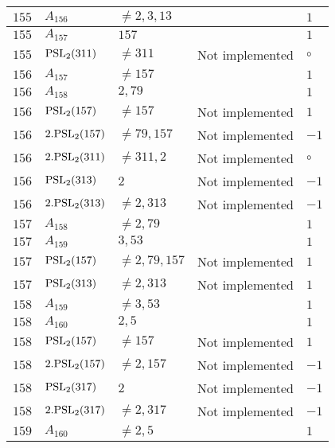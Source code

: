 \documentclass[a4paper, 11pt]{article}
\begin{document}
\begin{longtable}{lllll}
        $ 155 $ & $ A_{156} $ & $ \neq 2, 3, 13 $ & $ ~ $ & $ 1  $ \\ \hline
        $ 155 $ & $ A_{157} $ & $ 157 $ & $ ~ $ & $ 1  $ \\ \hline
        $ 155 $ & $ {\rm PSL}_{2}(311) $ & $ \neq 311 $ & Not implemented & $\circ$ \\ \hline
        $ 156 $ & $ A_{157} $ & $ \neq 157 $ & $ ~ $ & $ 1  $ \\ \hline
        $ 156 $ & $ A_{158} $ & $ 2, 79 $ & $ ~ $ & $ 1  $ \\ \hline
        $ 156 $ & $ {\rm PSL}_{2}(157) $ & $ \neq 157 $ & Not implemented & $ 1  $ \\ \hline
        $ 156 $ & $ 2.{\rm PSL}_{2}(157) $ & $ \neq 79, 157 $ & Not implemented & $ -1  $ \\ \hline
        $ 156 $ & $ 2.{\rm PSL}_{2}(311) $ & $ \neq 311, 2 $ & Not implemented & $\circ$ \\ \hline
        $ 156 $ & $ {\rm PSL}_{2}(313) $ & $ 2 $ & Not implemented & $ -1  $ \\ \hline
        $ 156 $ & $ 2.{\rm PSL}_{2}(313) $ & $ \neq 2, 313 $ & Not implemented & $ -1  $ \\ \hline
        $ 157 $ & $ A_{158} $ & $ \neq 2, 79 $ & $ ~ $ & $ 1  $ \\ \hline
        $ 157 $ & $ A_{159} $ & $ 3, 53 $ & $ ~ $ & $ 1  $ \\ \hline
        $ 157 $ & $ {\rm PSL}_{2}(157) $ & $ \neq 2, 79, 157 $ & Not implemented & $ 1  $ \\ \hline
        $ 157 $ & $ {\rm PSL}_{2}(313) $ & $ \neq 2, 313 $ & Not implemented & $ 1  $ \\ \hline
        $ 158 $ & $ A_{159} $ & $ \neq 3, 53 $ & $ ~ $ & $ 1  $ \\ \hline
        $ 158 $ & $ A_{160} $ & $ 2, 5 $ & $ ~ $ & $ 1  $ \\ \hline
        $ 158 $ & $ {\rm PSL}_{2}(157) $ & $ \neq 157 $ & Not implemented & $ 1  $ \\ \hline
        $ 158 $ & $ 2.{\rm PSL}_{2}(157) $ & $ \neq 2, 157 $ & Not implemented & $ -1  $ \\ \hline
        $ 158 $ & $ {\rm PSL}_{2}(317) $ & $ 2 $ & Not implemented & $ -1  $ \\ \hline
        $ 158 $ & $ 2.{\rm PSL}_{2}(317) $ & $ \neq 2, 317 $ & Not implemented & $ -1  $ \\ \hline
        $ 159 $ & $ A_{160} $ & $ \neq 2, 5 $ & $ ~ $ & $ 1  $ \\ \hline

\end{longtable}
\end{document}
